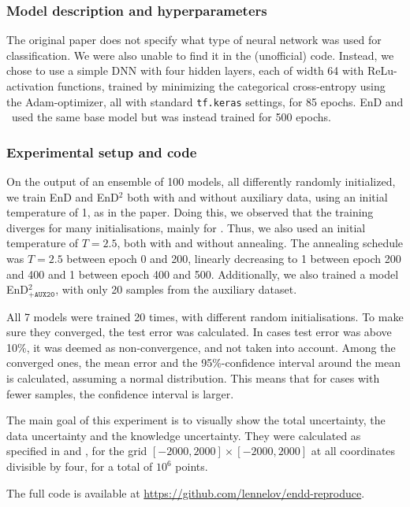  

\subsubsection{Model description and hyperparameters}
The original paper does not specify what type of neural network was used for classification. We were also unable to find it in the (unofficial) code. Instead, we chose to use a simple DNN with four hidden layers, each of width 64 with ReLu-activation functions, trained by minimizing the categorical cross-entropy using the Adam-optimizer, all with standard \texttt{tf.keras} settings, for 85 epochs. EnD and \EnDD \ used the same base model but was instead trained for 500 epochs. 


\subsubsection{Experimental setup and code}

On the output of an ensemble of 100 models, all differently randomly initialized, we train EnD and EnD$^2$ both with and without auxiliary data, using an initial temperature of 1, as in the paper. Doing this, we observed that the training diverges for many initialisations, mainly for \EnDDaux. Thus, we also used an initial temperature of $T = 2.5$, both with and without annealing. The annealing schedule was $T = 2.5$ between epoch 0 and 200, linearly decreasing to 1 between epoch 200 and 400 and 1 between epoch 400 and 500. Additionally, we also trained a model EnD$^2_{\texttt{+AUX20}}$, with only 20 samples from the auxiliary dataset. 

All 7 models were trained 20 times, with different random initialisations. To make sure they converged, the test error was calculated. In cases test error was above 10\%, it was deemed as non-convergence, and not taken into account. Among the converged ones, the mean error and the 95\%-confidence interval around the mean is calculated, assuming a normal distribution. This means that for cases with fewer samples, the confidence interval is larger.  

The main goal of this experiment is to visually show the total uncertainty, the data uncertainty and the knowledge uncertainty. They were calculated as specified in \cite{malinin2019ensemble} and \cite{NIPS2018_7936}, for the grid $[-2000, 2000] \times [-2000, 2000]$ at all coordinates divisible by four, for a total of $10^6$ points. 

The full code is available at \href{https://github.com/lennelov/endd-reproduce}{https://github.com/lennelov/endd-reproduce}.



